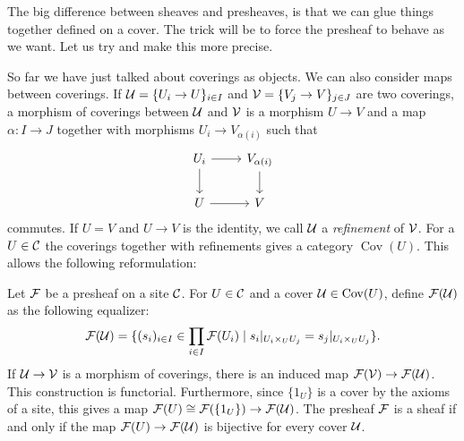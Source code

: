 \documentclass{article}
\DeclareMathOperator{\Cov}{Cov}
\begin{document}
The big difference between sheaves and presheaves, is that we can glue
things together defined on a cover. The trick will be to force
the presheaf to behave as we want. Let us try and make this more precise.

So far we have just talked about coverings as objects. We can
also consider maps between coverings. If $\mathcal{U} = \{U_i \to U\}_{i\in I}$
and $\mathcal{V} = \{V_j \to V\}_{j \in J}$ are two coverings, a morphism
of coverings between $\mathcal{U}$ and $\mathcal{V}$ is
a morphism $U \to V$ and a map $\alpha \colon I \to J$
together with morphisms $U_i \to V_{\alpha(i)}$
such that
\begin{equation*}
    \begin{tikzcd}
        U_i \ar[d] \rar & V_{\alpha(i)} \dar\\
        U \rar & V
    \end{tikzcd}
\end{equation*}
commutes. If $U = V$ and $U \to V$ is the identity,
we call $\mathcal{U}$ a \emph{refinement} of $\mathcal{V}$.
For a $ U \in \mathcal{C}$ the coverings together with refinements
gives a category $\Cov(U)$.
This allows the following reformulation:
\begin{lemma}
    \label{lem:presheaf_of_cover}
    Let $\mathcal{F}$ be a presheaf on a site $\mathcal{C}$.
    For $U \in \mathcal{C}$ and a cover $\mcU \in \Cov(U)$, define
    $\mathcal{F}(\mathcal{U})$ as the following equalizer:
    \begin{equation*}
        \mathcal{F}(\mathcal{U}) =
        \{(s_i)_{i\in I} \in \prod\limits_{i\in I}\mathcal{F}(U_i)\mid
        s_i|_{U_i \times_U U_j} = s_j|_{U_i \times_U U_j}\}.
    \end{equation*}
    If $\mathcal{U} \to \mathcal{V}$ is a morphism of coverings, there is an induced
    map $\mathcal{F}(\mathcal{V}) \to \mathcal{F}(\mathcal{U})$. This construction is functorial.
    Furthermore, since $\{1_U\}$ is a cover
    by the axioms of a site, this gives a map $\mathcal{F}(U) \cong \mathcal{F}(\{1_U\}) \to \mathcal{F}(\mathcal{U})$.
    The presheaf $\mathcal{F}$ is a sheaf if and only if the map
    $\mathcal{F}(U) \to \mathcal{F}(\mathcal{U})$ is bijective
    for every cover $\mathcal{U}$.
\end{lemma}
\end{document}
